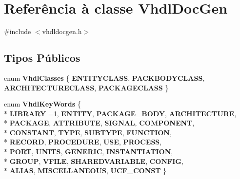 \hypertarget{class_vhdl_doc_gen}{\section{Referência à classe Vhdl\-Doc\-Gen}
\label{class_vhdl_doc_gen}
}


{\ttfamily \#include $<$vhdldocgen.\-h$>$}

\subsection*{Tipos Públicos}
\begin{DoxyCompactItemize}
\item 
enum {\bfseries Vhdl\-Classes} \{ {\bfseries E\-N\-T\-I\-T\-Y\-C\-L\-A\-S\-S}, 
{\bfseries P\-A\-C\-K\-B\-O\-D\-Y\-C\-L\-A\-S\-S}, 
{\bfseries A\-R\-C\-H\-I\-T\-E\-C\-T\-U\-R\-E\-C\-L\-A\-S\-S}, 
{\bfseries P\-A\-C\-K\-A\-G\-E\-C\-L\-A\-S\-S}
 \}
\item 
enum {\bfseries Vhdl\-Key\-Words} \{ \\*
{\bfseries L\-I\-B\-R\-A\-R\-Y} =1, 
{\bfseries E\-N\-T\-I\-T\-Y}, 
{\bfseries P\-A\-C\-K\-A\-G\-E\-\_\-\-B\-O\-D\-Y}, 
{\bfseries A\-R\-C\-H\-I\-T\-E\-C\-T\-U\-R\-E}, 
\\*
{\bfseries P\-A\-C\-K\-A\-G\-E}, 
{\bfseries A\-T\-T\-R\-I\-B\-U\-T\-E}, 
{\bfseries S\-I\-G\-N\-A\-L}, 
{\bfseries C\-O\-M\-P\-O\-N\-E\-N\-T}, 
\\*
{\bfseries C\-O\-N\-S\-T\-A\-N\-T}, 
{\bfseries T\-Y\-P\-E}, 
{\bfseries S\-U\-B\-T\-Y\-P\-E}, 
{\bfseries F\-U\-N\-C\-T\-I\-O\-N}, 
\\*
{\bfseries R\-E\-C\-O\-R\-D}, 
{\bfseries P\-R\-O\-C\-E\-D\-U\-R\-E}, 
{\bfseries U\-S\-E}, 
{\bfseries P\-R\-O\-C\-E\-S\-S}, 
\\*
{\bfseries P\-O\-R\-T}, 
{\bfseries U\-N\-I\-T\-S}, 
{\bfseries G\-E\-N\-E\-R\-I\-C}, 
{\bfseries I\-N\-S\-T\-A\-N\-T\-I\-A\-T\-I\-O\-N}, 
\\*
{\bfseries G\-R\-O\-U\-P}, 
{\bfseries V\-F\-I\-L\-E}, 
{\bfseries S\-H\-A\-R\-E\-D\-V\-A\-R\-I\-A\-B\-L\-E}, 
{\bfseries C\-O\-N\-F\-I\-G}, 
\\*
{\bfseries A\-L\-I\-A\-S}, 
{\bfseries M\-I\-S\-C\-E\-L\-L\-A\-N\-E\-O\-U\-S}, 
{\bfseries U\-C\-F\-\_\-\-C\-O\-N\-S\-T}
 \}
\end{DoxyCompactItemize}
